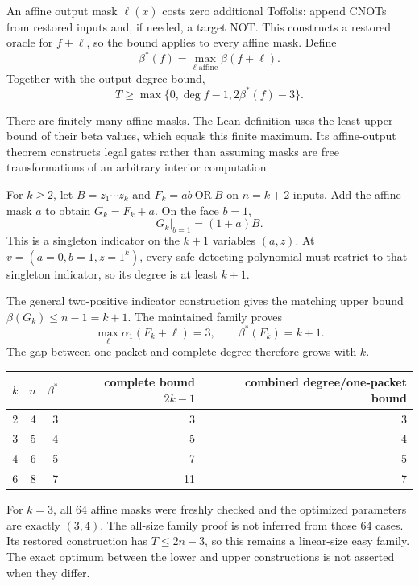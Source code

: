 An affine output mask $\ell(x)$ costs zero additional Toffolis: append
CNOTs from restored inputs and, if needed, a target NOT. This constructs
a restored oracle for $f+\ell$, so the bound applies to every affine mask.
Define
\[
 \beta^*(f)=\max_{\ell\text{ affine}}\beta(f+\ell).
\]
Together with the output degree bound,
\[
 \boxed{T\ge\max\{0,\deg f-1,2\beta^*(f)-3\}.}
\]

There are finitely many affine masks. The Lean definition uses the least
upper bound of their beta values, which equals this finite maximum. Its
affine-output theorem constructs legal gates rather than assuming masks
are free transformations of an arbitrary interior computation.


For $k\ge2$, let $B=z_1\cdots z_k$ and $F_k=ab\ \mathrm{OR}\ B$ on
$n=k+2$ inputs. Add the affine mask $a$ to obtain $G_k=F_k+a$.
On the face $b=1$,
\[
 G_k|_{b=1}=(1+a)B.
\]
This is a singleton indicator on the $k+1$ variables $(a,z)$.
At $v=(a=0,b=1,z=1^k)$, every safe detecting polynomial must restrict to
that singleton indicator, so its degree is at least $k+1$.

The general two-positive indicator construction gives the matching upper
bound $\beta(G_k)\le n-1=k+1$. The maintained family proves
\[
 \max_\ell\alpha_1(F_k+\ell)=3,\qquad \beta^*(F_k)=k+1.
\]
The gap between one-packet and complete degree therefore grows with $k$.

\begin{center}
\begin{tabular}{@{}rrrrr@{}}\toprule
$k$ & $n$ & $\beta^*$ & complete bound $2k-1$ & combined degree/one-packet bound\\\midrule
2 & 4 & 3 & 3 & 3\\
3 & 5 & 4 & 5 & 4\\
4 & 6 & 5 & 7 & 5\\
6 & 8 & 7 & 11 & 7\\\bottomrule
\end{tabular}
\end{center}

For $k=3$, all 64 affine masks were freshly checked and the optimized
parameters are exactly $(3,4)$. The all-size family proof is not inferred
from those 64 cases. Its restored construction has $T\le2n-3$, so this
remains a linear-size easy family. The exact optimum between the lower and
upper constructions is not asserted when they differ.

